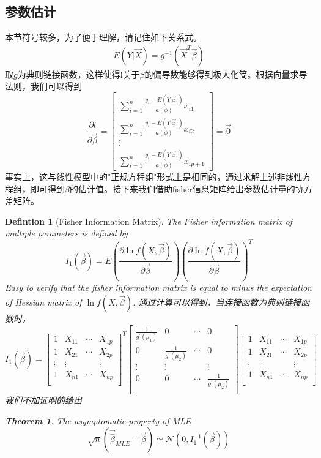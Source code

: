 \documentclass[12pt]{article}
\newtheorem{Theorem}{Theorem}[section]
\newtheorem{Definition}{Defintion}[section]
\begin{document}
\subsection{参数估计}
本节符号较多，为了便于理解，请记住如下关系式。
\begin{eqnarray*}
	E(Y|\vec X) = g^{-1}(\vec{X}^T \vec \beta)
\end{eqnarray*}
取$g$为典则链接函数，这样使得l关于$\beta$的偏导数能够得到极大化简。根据向量求导法则，我们可以得到
$$
\frac{\partial l}{\partial \vec \beta} = 
\begin{bmatrix}
	\sum_{i=1}^{n} \frac{y_i-E(Y|\vec{x}_i)}{a(\phi)}x_{i1}\\ 
	\sum_{i=1}^{n} \frac{y_i-E(Y|\vec{x}_i)}{a(\phi)}x_{i2} \\ 
	\vdots \\ 
	\sum_{i=1}^{n} \frac{y_i-E(Y|\vec{x}_i)}{a(\phi)}x_{ip+1}
\end{bmatrix}
= \vec 0 
$$
事实上，这与线性模型中的"正规方程组"形式上是相同的，通过求解上述非线性方程组，即可得到$\beta$的估计值。接下来我们借助fisher信息矩阵给出参数估计量的协方差矩阵。
\begin{Definition}[Fisher Information Matrix]{\label{fim}} The Fisher information matrix of multiple parameters is defined by 
$$
I_1(\vec{\beta}) = E(\frac{\partial \ln f(X,\vec \beta)}{\partial \vec \beta})(\frac{\partial \ln f(X,\vec \beta)}{\partial \vec \beta})^T
$$
Easy to verify that the fisher information matrix is equal to minus the expectation of Hessian matrix of $\ln f(X,\vec{\beta})$.
通过计算可以得到，当连接函数为典则链接函数时，
$$
I_1(\vec{\beta}) = 
\begin{bmatrix}
	1 & X_{11} & \cdots & X_{1p} \\
	1 & X_{21} & \cdots & X_{2p} \\
	\vdots & \vdots & &\vdots \\
	1 & X_{n1} & \cdots & X_{np} \\
\end{bmatrix}^T
\begin{bmatrix}
	\frac{1}{g^{'}(\mu_1)} & 0 & \cdots &0 \\
	0 &\frac{1}{g^{'}(\mu_2)} & \cdots & 0 \\
	\vdots & \vdots & &\vdots \\
	0 & 0 & \cdots & \frac{1}{g^{'}(\mu_2)} \\
\end{bmatrix}
\begin{bmatrix}
	1 & X_{11} & \cdots & X_{1p} \\
	1 & X_{21} & \cdots & X_{2p} \\
	\vdots & \vdots & &\vdots \\
	1 & X_{n1} & \cdots & X_{np} \\
\end{bmatrix}
$$
我们不加证明的给出
\begin{Theorem}{The asymptomatic property of MLE}
	$$
\sqrt n(\vec{\hat \beta}_{MLE}-\vec{\beta}) \simeq \mathcal{N}(0,I_1^{-1}(\vec{\beta}))
$$
\end{Theorem}

\end{Definition} 
\end{document}
